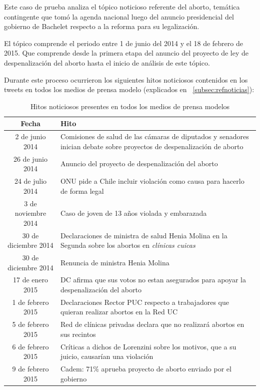 
Este caso de prueba analiza el tópico noticioso referente del aborto, temática contingente que tomó la agenda nacional luego del anuncio presidencial del gobierno de Bachelet respecto a la reforma para su legalización.

El tópico comprende el periodo entre 1 de junio del 2014 y el 18 de febrero de 2015. Que comprende desde la primera etapa del anuncio del proyecto de ley de despenalización del aborto hasta el inicio de análisis de este tópico. 

Durante este proceso ocurrieron los siguientes hitos noticiosos contenidos en los tweets en todos los medios de prensa modelo (explicados en ~\ref{subsec:refnoticias}):

\begin{table}[H]
	\centering
	\begin{tabular}{| c | p{10cm} |}
		\hline
		Fecha    & Hito \\ \hline
		2 de junio 2014 & Comisiones de salud de las cámaras de diputados y senadores inician debate sobre proyectos de despenalización de aborto \\ \hline
		26 de junio 2014 & Anuncio del proyecto de despenalización del aborto \\ \hline
		24 de julio 2014 & ONU pide a Chile incluir violación como causa para hacerlo de forma legal \\ \hline
		3 de noviembre 2014 & Caso de joven de 13 años violada y embarazada \\ \hline
		30 de diciembre 2014 & Declaraciones de ministra de salud Henia Molina en la Segunda sobre los abortos en \emph{clínicas cuicas}\\ \hline
		30 de diciembre 2014 & Renuncia de ministra Henia Molina \\ \hline
		17 de enero 2015 & DC afirma que sus votos no estan asegurados para apoyar la despenalización del aborto \\ \hline
		1 de febrero 2015 & Declaraciones Rector PUC respecto a trabajadores que quieran realizar abortos en la Red UC \\ \hline
		5 de febrero 2015 & Red de clínicas privadas declara que no realizará abortos en sus recintos \\ \hline
		6 de febrero 2015 & Críticas a dichos de Lorenzini sobre los motivos, que a su juicio, causarían una violación \\ \hline
		9 de febrero 2015 & Cadem: 71\% aprueba proyecto de aborto enviado por el gobierno \\ \hline
	\end{tabular}
	\caption {Hitos noticiosos presentes en todos los medios de prensa modelos}
	\label{table:123_hitos_noticiosos}
\end{table}

